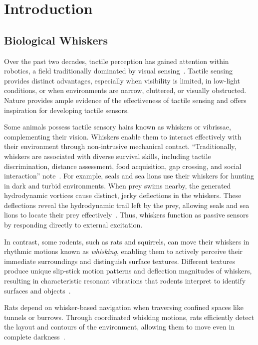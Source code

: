 

\chapter{Introduction}


\section{Biological Whiskers}

Over the past two decades, tactile perception has gained attention within robotics, a field traditionally dominated by visual sensing~\cite{s22072705}.
Tactile sensing provides distinct advantages, especially when visibility is limited, in low-light conditions, or when environments are narrow, cluttered, or visually obstructed.
Nature provides ample evidence of the effectiveness of tactile sensing and offers inspiration for developing tactile sensors.

Some animals possess tactile sensory hairs known as whiskers or vibrissae, complementing their vision.
Whiskers enable them to interact effectively with their environment through non-intrusive mechanical contact.
\enquote{Traditionally, whiskers are associated with diverse survival skills, including tactile discrimination, distance assessment, food acquisition, gap crossing, and social interaction} note~\textcite{IBARRACASTANEDA2022100034}.
For example, seals and sea lions use their whiskers for hunting in dark and turbid environments.
When prey swims nearby, the generated hydrodynamic vortices cause distinct, jerky deflections in the whiskers.
These deflections reveal the hydrodynamic trail left by the prey, allowing seals and sea lions to locate their prey effectively~\cite{muthuramalingam2018sealsealionwhiskers}.
Thus, whiskers function as passive sensors by responding directly to external excitation.

In contrast, some rodents, such as rats and squirrels, can move their whiskers in rhythmic motions known as \textit{whisking}, enabling them to actively perceive their immediate surroundings and distinguish surface textures.
Different textures produce unique slip-stick motion patterns and deflection magnitudes of whiskers, resulting in characteristic resonant vibrations that rodents interpret to identify surfaces and objects~\cite{wolfe2008texture}.

Rats depend on whisker-based navigation when traversing confined spaces like tunnels or burrows.
Through coordinated whisking motions, rats efficiently detect the layout and contours of the environment, allowing them to move even in complete darkness~\cite{wolfe2008texture}.

